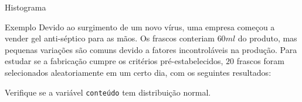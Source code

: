 \documentclass[10pt]{beamer}
\begin{document}
\begin{frame}{Histograma}

 \begin{block}{Exemplo}
	Devido ao surgimento de um novo vírus, uma empresa começou a vender gel anti-séptico para as mãos. Os frascos conteriam $60ml$ do produto, mas pequenas variações são comuns devido a fatores incontroláveis na produção. Para estudar se a fabricação cumpre os critérios pré-estabelecidos, $20$ frascos foram selecionados aleatoriamente em um certo dia, com os seguintes resultados:
	\begin{table}[htbp]
	\end{table}
	Verifique se a variável \texttt{conteúdo} tem distribuição normal.
\end{block}	

\end{frame}
\end{document}
